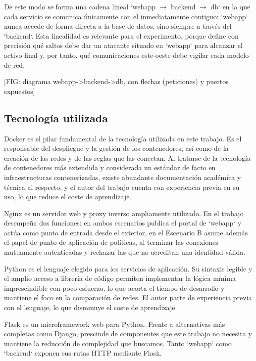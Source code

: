         De este modo se forma una cadena lineal `webapp $\rightarrow$ backend $\rightarrow$ db` en la que cada servicio se comunica únicamente con el inmediatamente contiguo: `webapp` nunca accede de forma directa a la base de datos, sino siempre a través del `backend`. Esta linealidad es relevante para el experimento, porque define con precisión qué saltos debe dar un atacante situado en `webapp` para alcanzar el activo final y, por tanto, qué comunicaciones este-oeste debe vigilar cada modelo de red.

        [FIG: diagrama webapp->backend->db, con flechas (peticiones) y puertos expuestos]
        
        \subsection{Tecnología utilizada}
        Docker es el pilar fundamental de la tecnología utilizada en este trabajo. Es el responsable del despliegue y la gestión de los contenedores, así como de la creación de las redes y de las reglas que las conectan. Al tratarse de la tecnología de contenedores más extendida y considerada un estándar de facto en infraestructuras contenerizadas, existe abundante documentación académica y técnica al respecto, y el autor del trabajo cuenta con experiencia previa en su uso, lo que reduce el coste de aprendizaje.

        Nginx es un servidor web y proxy inverso ampliamente utilizado. En el trabajo desempeña dos funciones: en ambos escenarios publica el portal de `webapp` y actúa como punto de entrada desde el exterior, en el Escenario B asume además el papel de punto de aplicación de políticas, al terminar las conexiones mutuamente autenticadas y rechazar las que no acreditan una identidad válida.

        Python es el lenguaje elegido para los servicios de aplicación. Su sintaxis legible y el amplio acceso a librería de código permiten implementar la lógica mínima imprescindible con poco esfuerzo, lo que acorta el tiempo de desarrollo y mantiene el foco en la comparación de redes. El autor parte de experiencia previa con el lenguaje, lo que disminuye el coste de aprendizaje.

        Flask es un microframework web para Python. Frente a alternativas más completas como Django, prescinde de componentes que este trabajo no necesita y mantiene la reducción de complejidad que buscamos. Tanto `webapp` como `backend` exponen sus rutas HTTP mediante Flask.

